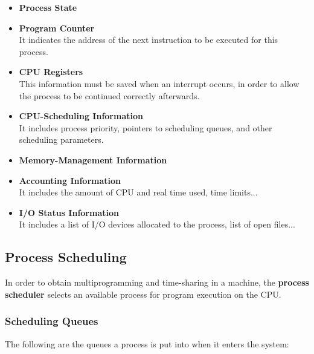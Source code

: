 \documentclass{article}
\begin{document}
\begin{itemize}
	\item \textbf{Process State}
	
	\item \textbf{Program Counter}
	\vspace{.2cm} \\
	It indicates the address of the next instruction to be executed for this process.
	
	\item \textbf{CPU Registers}
	\vspace{.2cm} \\
	This information must be saved when an interrupt occurs, in order to allow the process to be continued correctly afterwards.
	
	\item \textbf{CPU-Scheduling Information}
	\vspace{.2cm} \\
	It includes process priority, pointers to scheduling queues, and other scheduling parameters.
	
	\item \textbf{Memory-Management Information}
	
	\item \textbf{Accounting Information}
	\vspace{.2cm} \\
	It includes the amount of CPU and real time used, time limits...
	
	\item \textbf{I/O Status Information}
	\vspace{.2cm} \\
	It includes a list of I/O devices allocated to the process, list of open files...
\end{itemize}

\subsection{Process Scheduling}
In order to obtain multiprogramming and time-sharing in a machine, the \textbf{process scheduler} selects an available process for program execution on the CPU.

\subsubsection{Scheduling Queues}
The following are the queues a process is put into when it enters the system:
\end{document}
